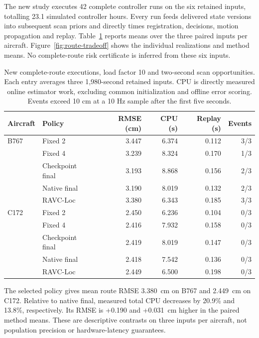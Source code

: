 The new study executes 42 complete controller runs on the six retained inputs, totalling 23.1 simulated controller hours. Every run feeds delivered state versions into subsequent scan priors and directly times registration, decisions, motion propagation and replay. Table~\ref{tab:new-routes} reports means over the three paired inputs per aircraft. Figure~\ref{fig:route-tradeoff} shows the individual realizations and method means. No complete-route risk certificate is inferred from these six inputs.

\begin{table}[t]\centering\small
\caption{New complete-route executions, load factor 10 and two-second scan opportunities. Each entry averages three 1,980-second retained inputs. CPU is directly measured online estimator work, excluding common initialization and offline error scoring. Events exceed 10 cm at a 10 Hz sample after the first five seconds.}\label{tab:new-routes}
\begin{tabular}{@{}llrrrr@{}}\toprule Aircraft&Policy&RMSE (cm)&CPU (s)&Replay (s)&Events\\\midrule

B767&Fixed 2&3.447&6.374&0.112&3/3\\

&Fixed 4&3.239&8.324&0.170&1/3\\

&Checkpoint final&3.193&8.868&0.156&2/3\\

&Native final&3.190&8.019&0.132&2/3\\

&RAVC-Loc&3.380&6.343&0.185&3/3\\

\midrule

C172&Fixed 2&2.450&6.236&0.104&0/3\\

&Fixed 4&2.416&7.932&0.158&0/3\\

&Checkpoint final&2.419&8.019&0.147&0/3\\

&Native final&2.418&7.542&0.136&0/3\\

&RAVC-Loc&2.449&6.500&0.198&0/3\\

\bottomrule\end{tabular}\end{table}

The selected policy gives mean route RMSE 3.380~cm on B767 and 2.449~cm on C172. Relative to native final, measured total CPU decreases by 20.9\% and 13.8\%, respectively. Its RMSE is +0.190 and +0.031~cm higher in the paired method means. These are descriptive contrasts on three inputs per aircraft, not population precision or hardware-latency guarantees.

